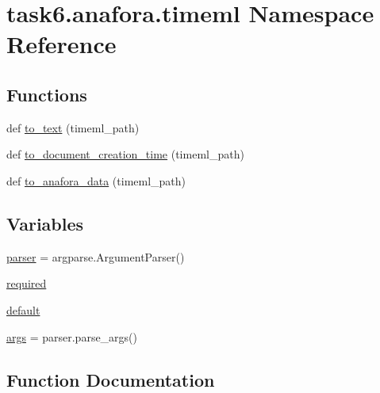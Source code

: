 \hypertarget{namespacetask6_1_1anafora_1_1timeml}{}\section{task6.\+anafora.\+timeml Namespace Reference}
\label{namespacetask6_1_1anafora_1_1timeml}
\subsection*{Functions}
\begin{DoxyCompactItemize}
\item 
def \hyperlink{namespacetask6_1_1anafora_1_1timeml_a9e1675119c8ba69f2bd6385ca97f0d8f}{to\+\_\+text} (timeml\+\_\+path)
\item 
def \hyperlink{namespacetask6_1_1anafora_1_1timeml_adae0cff8bc3e9b83f8ce5666d621e4cf}{to\+\_\+document\+\_\+creation\+\_\+time} (timeml\+\_\+path)
\item 
def \hyperlink{namespacetask6_1_1anafora_1_1timeml_a488b11162480fa84bb19e04c9748697b}{to\+\_\+anafora\+\_\+data} (timeml\+\_\+path)
\end{DoxyCompactItemize}
\subsection*{Variables}
\begin{DoxyCompactItemize}
\item 
\hyperlink{namespacetask6_1_1anafora_1_1timeml_a49abbdd72bfeb677e7643a7b3e6cd05b}{parser} = argparse.\+Argument\+Parser()
\item 
\hyperlink{namespacetask6_1_1anafora_1_1timeml_abb99ebab7f300f0abbda807c3f9617b0}{required}
\item 
\hyperlink{namespacetask6_1_1anafora_1_1timeml_a791808621f087c3c30d2018b69ddac8a}{default}
\item 
\hyperlink{namespacetask6_1_1anafora_1_1timeml_adfdc469b202d0d0b4357f43efe3d4b86}{args} = parser.\+parse\+\_\+args()
\end{DoxyCompactItemize}


\subsection{Function Documentation}
\mbox{\label{namespacetask6_1_1anafora_1_1timeml_a488b11162480fa84bb19e04c9748697b}} 
